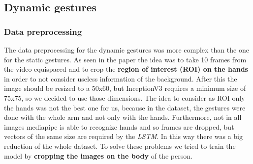 \documentclass[10pt,twocolumn,letterpaper]{article}
\begin{document}
\subsection{Dynamic gestures}
\subsubsection{Data preprocessing}
\label{subsec:datapreprocessing}
The data preprocessing for the dynamic gestures was more complex than the one for the static gestures. As seen in the paper \cite{electronics13163233} the idea was to take 10 frames from the video equispaced and to crop the \textbf{region of interest (ROI) on the hands} in order to not consider useless information of the background.
After this the image should be resized to a 50x60, but InceptionV3 requires a minimum size 
of 75x75, so we decided to use those dimensions.
The idea to consider as ROI only the hands was not the best one for us, because in the dataset, the gestures were done with the whole arm and not only with the hands. Furthermore, not in all images mediapipe is able to recognize hands and so frames are dropped, but vectors of the same size are required by the \textit{LSTM}. In this way there was a big reduction of the whole dataset.
To solve these problems we tried to train the model by \textbf{cropping the images on the body} of the person.
\end{document}
